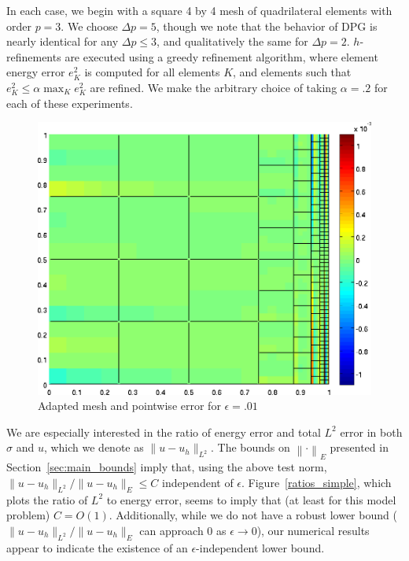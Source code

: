 \documentclass[11pt,onecolumn]{scrartcl}
\newcommand{\nor}[1]{\left\| #1 \right\|}
\begin{document}
In each case, we begin with a square 4 by 4 mesh of quadrilateral elements with order $p=3$.  We choose $\Delta p = 5$, though we note that the behavior of DPG is nearly identical for any $\Delta p \leq 3$, and qualitatively the same for $\Delta p = 2$.  $h$-refinements are executed using a greedy refinement algorithm, where element energy error $e_K^2$ is computed for all elements $K$, and elements such that $e_K^2 \leq \alpha \max_K e_K^2$ are refined.  We make the arbitrary choice of taking $\alpha = .2$ for each of these experiments.  

\begin{figure}[h!]
\centering
\includegraphics[scale=.4]{figs/u_pointdiff_wallBC.png}
\caption{Adapted mesh and pointwise error for $\epsilon=.01$}
\end{figure}
We are especially interested in the ratio of energy error and total $L^2$ error in both $\sigma$ and $u$, which we denote as $\|u-u_h\|_{L^2}$.  The bounds on $\nor{\cdot}_E$ presented in Section~\ref{sec:main_bounds} imply that, using the above test norm, $\|u-u_h\|_{L^2} / \|u-u_h\|_E \leq C$ independent of $\epsilon$.  Figure~\ref{ratios_simple}, which plots the ratio of $L^2$ to energy error, seems to imply that (at least for this model problem) $C=O(1)$.  Additionally, while we do not have a robust lower bound ($\|u-u_h\|_{L^2} / \|u-u_h\|_E$ can approach $0$ as $\epsilon \rightarrow 0$), our numerical results appear to indicate the existence of an $\epsilon$-independent lower bound. 
\end{document}
